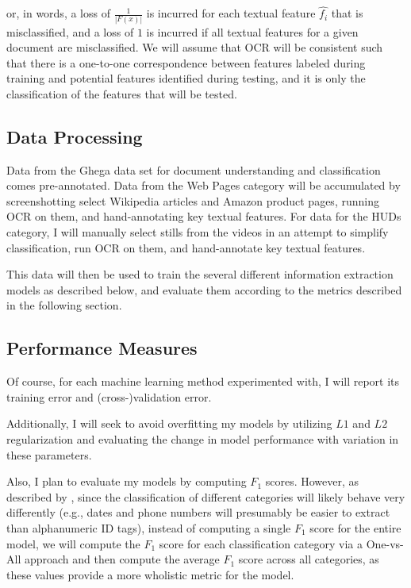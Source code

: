 \documentclass[twoside,11pt]{article}
\renewcommand{\>}{{\rightarrow}}
\renewcommand{\hat}{\widehat}
\newcommand{\1}{{\mathbf 1}}
\newcommand{\0}{{\mathbf 0}}
\begin{document}
or, in words, a loss of $\frac{1}{|F(x)|}$ is incurred for each textual feature $\hat{f_i}$ that is misclassified, and a loss of $1$ is incurred if all textual features for a given document are misclassified. We will assume that OCR will be consistent such that there is a one-to-one correspondence between features labeled during training and potential features identified during testing, and it is only the classification of the features that will be tested.

\subsection{Data Processing}
Data from the Ghega data set for document understanding and classification comes pre-annotated. Data from the Web Pages category will be accumulated by screenshotting select Wikipedia articles and Amazon product pages, running OCR on them, and hand-annotating key textual features. For data for the HUDs category, I will manually select stills from the videos in an attempt to simplify classification, run OCR on them, and hand-annotate key textual features.

This data will then be used to train the several different information extraction models as described below, and evaluate them according to the metrics described in the following section.

\subsection{Performance Measures}
Of course, for each machine learning method experimented with, I will report its training error and (cross-)validation error.

Additionally, I will seek to avoid overfitting my models by utilizing $L1$ and $L2$ regularization and evaluating the change in model performance with variation in these parameters.

Also, I plan to evaluate my models by computing $F_1$ scores. However, as described by \cite{LiuWanZhang2016}, since the classification of different categories will likely behave very differently (e.g., dates and phone numbers will presumably be easier to extract than alphanumeric ID tags), instead of computing a single $F_1$ score for the entire model, we will compute the $F_1$ score for each classification category via a One-vs-All approach and then compute the average $F_1$ score across all categories, as these values provide a more wholistic metric for the model.
\end{document}
